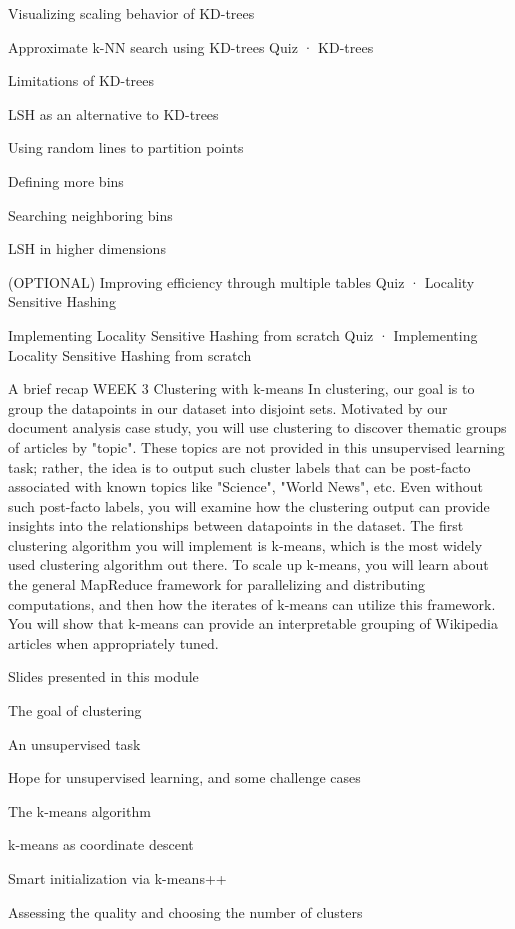 \item Visualizing scaling behavior of KD-trees
\item Approximate k-NN search using KD-trees
Quiz · KD-trees
\item Limitations of KD-trees
\item LSH as an alternative to KD-trees
\item Using random lines to partition points
\item Defining more bins
\item Searching neighboring bins
\item LSH in higher dimensions
\item (OPTIONAL) Improving efficiency through multiple tables
Quiz · Locality Sensitive Hashing
\item Implementing Locality Sensitive Hashing from scratch
Quiz · Implementing Locality Sensitive Hashing from scratch
\item A brief recap
WEEK 3
Clustering with k-means
In clustering, our goal is to group the datapoints in our dataset into disjoint sets. Motivated by our document analysis case study, you will use clustering to discover thematic groups of articles by "topic". These topics are not provided in this unsupervised learning task; rather, the idea is to output such cluster labels that can be post-facto associated with known topics like "Science", "World News", etc. Even without such post-facto labels, you will examine how the clustering output can provide insights into the relationships between datapoints in the dataset. The first clustering algorithm you will implement is k-means, which is the most widely used clustering algorithm out there. To scale up k-means, you will learn about the general MapReduce framework for parallelizing and distributing computations, and then how the iterates of k-means can utilize this framework. You will show that k-means can provide an interpretable grouping of Wikipedia articles when appropriately tuned.
\item Slides presented in this module
\item The goal of clustering
\item An unsupervised task
\item Hope for unsupervised learning, and some challenge cases
\item The k-means algorithm
\item k-means as coordinate descent
\item Smart initialization via k-means++
\item Assessing the quality and choosing the number of clusters
